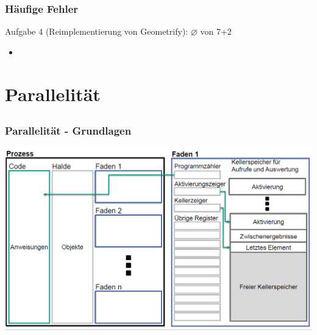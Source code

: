 \documentclass[18pt]{beamer}
\begin{document}
	\begin{frame}
		\frametitle{Häufige Fehler}
		\begin{block}{Aufgabe 4 (Reimplementierung von Geometrify): $\diameter$ von 7+2} %
			\begin{itemize}
				\pause
				\item %
			\end{itemize}
		\end{block}
	\end{frame}

	
	
	
\section{Parallelität}
	\subsection{}	
	
	\begin{frame}
		\frametitle{Parallelität - Grundlagen}
		\includegraphics[scale=0.34]{./pics/tut5/proc-thr.png}
	\end{frame}
\end{document}
